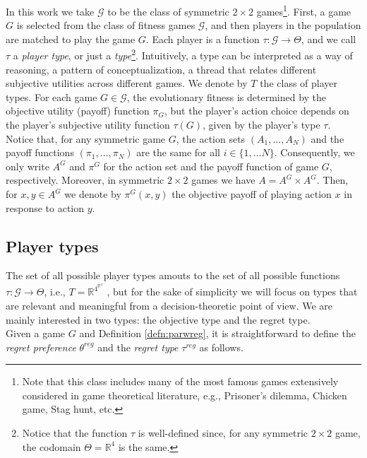 \documentclass[fleqn,reqno,11pt]{article}
\begin{document}
In this work we take $\mathcal{G}$ to be the class of symmetric $2 \times 2$ games\footnote{Note that this class includes many of the most famous games extensively considered in game theoretical literature, e.g., Prisoner's dilemma, Chicken game, Stag hunt, etc.}. First, a game $G$ is selected from the class of fitness games $\mathcal{G}$, and then players in the population are matched to play the game $G$. Each player is a function $\tau: \mathcal{G} \rightarrow  \Theta$, and we call $\tau$ a \textit{player type}, or just a \textit{type}\footnote{Notice that the function $\tau$ is well-defined since, for any symmetric $2 \times 2$ game, the codomain $\Theta=\mathbb{R}^{4}$ is the same.}. Intuitively, a type can be interpreted as a way of reasoning, a pattern of conceptualization, a thread that relates different subjective utilities across different games. We denote by $T$ the class of player types. For each game $G \in \mathcal{G}$, the evolutionary fitness is determined by the objective utility (payoff) function $\pi_G$, but the player's action choice depends on the player's subjective utility function $\tau(G)$, given by the player's type $\tau$. Notice that, for any symmetric game $G$, the action sets $(A_1, \dots, A_N)$ and the payoff functions $ (\pi_1, \dots, \pi_N)  $ are the same for all $i\in \lbrace 1, \dots N \rbrace$. Consequently, we only write $ A^G $ and $ \pi^G $ for the action set and the payoff function of game $G$, respectively. Moreover, in symmetric $2 \times 2$ games we have $A=A^G \times A^G$. Then, for $x,y \in A^G$ we denote by $\pi^G(x,y)$ the objective payoff of playing action $x$ in response to action $y$.\\



\subsection{Player types}

The set of all possible player types amouts to the set of all possible functions $ \tau: \mathcal{G} \rightarrow  \Theta $, i.e., $T=\mathbb{R}^{4^{\mathbb{R}^{4}}} $ , but for the sake of simplicity we will focus on types that are relevant and meaningful from a decision-theoretic point of view. We are mainly interested in two types: the objective type and the regret type.\\
Given a game $G$ and Definition \ref{defn:parwreg}, it is straightforward to define the \textit{regret preference} $\theta^{reg}$ and the \textit{regret type} $\tau^{reg}$ as follows.
\end{document}
